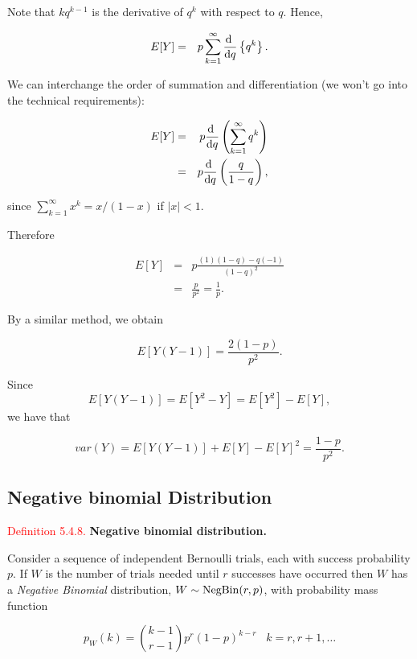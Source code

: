\documentclass[
]{book}
\begin{document}
Note that \(k q^{k-1}\) is the derivative of \(q^k\) with respect to \(q\). Hence,

\begin{eqnarray*}
E[Y] & = & p \sum_{k=1}^{\infty} \frac{{\rm d} \;}{{\rm d}q} \left\{ q^{k} \right\}.
\end{eqnarray*}

We can interchange the order of summation and differentiation (we won't go into the technical requirements):

\begin{eqnarray*}
E [Y] & = & p \frac{{\rm d} \;}{{\rm d}q} \left( \sum_{k=1}^{\infty} q^k\right) \\
& = & p \frac{{\rm d} \;}{{\rm d}q} \left( \frac{q}{1-q}\right),
 \end{eqnarray*}

since \(\sum_{k=1}^\infty x^k = x/(1-x)\) if \(|x| <1\).

Therefore

\begin{eqnarray*}
E [Y] & = & p \frac{(1)(1-q)- q(-1)}{(1-q)^2}\\
& = & \frac{p}{p^2} = \frac{1}{p}.
 \end{eqnarray*}

By a similar method, we obtain

\[
E[Y(Y-1)] =  \frac{2(1-p)}{p^{2}}.
\]

Since
\begin{equation}
E[Y(Y-1)]= E[Y^2-Y] = E[Y^2] -E[Y], 
\label{eq:sec}
\end{equation}
we have that

\[
var(Y) = E[Y(Y-1)] + E[Y] - E[Y]^{2} = \frac{1-p}{p^{2}}.
\]

\hypertarget{rv:Bernoulli:negbin}{%
\subsection{Negative binomial Distribution}\label{rv:Bernoulli:negbin}}

\leavevmode{}%
\textcolor{red}{Definition 5.4.8.}
{\textbf{Negative binomial distribution.}}

Consider a sequence of independent Bernoulli trials, each with success probability \(p\). If \(W\) is
the number of trials needed until \(r\) successes have occurred then \(W\) has a \emph{Negative
Binomial} distribution, \(W \sim {\rm Neg Bin} (r,p)\), with probability mass function

\[
p_W (k) = \binom{k-1}{r-1}p^{r}(1-p)^{k-r} \; \; \; k = r, r+1, \ldots
\]
\end{document}
